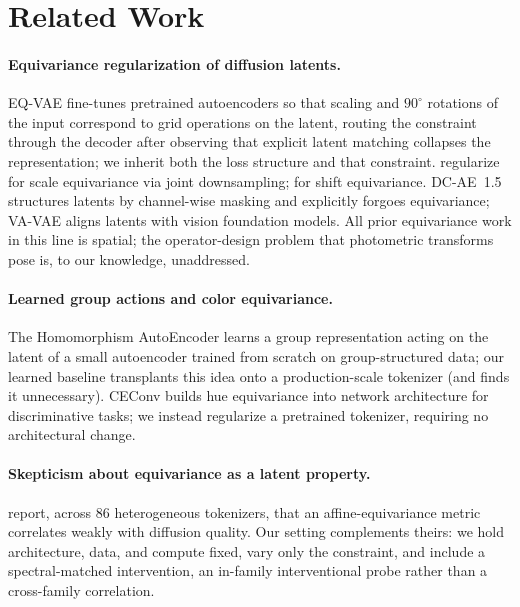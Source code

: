 \documentclass[11pt]{article}
\begin{document}
\section{Related Work}
\label{sec:related}

\paragraph{Equivariance regularization of diffusion latents.}
EQ-VAE \citep{kouzelis2025eqvae} fine-tunes pretrained autoencoders so that
scaling and $90^\circ$ rotations of the input correspond to grid operations on
the latent, routing the constraint through the decoder after observing that
explicit latent matching collapses the representation; we inherit both the
loss structure and that constraint. \citet{skorokhodov2025diffusability}
regularize for scale equivariance via joint downsampling;
\citet{zhou2025afldm} for shift equivariance. DC-AE~1.5
\citep{chen2025dcae15} structures latents by channel-wise masking and
explicitly forgoes equivariance; VA-VAE \citep{yao2025vavae} aligns latents
with vision foundation models. All prior equivariance work in this line is
spatial; the operator-design problem that photometric transforms pose is, to
our knowledge, unaddressed.

\paragraph{Learned group actions and color equivariance.}
The Homomorphism AutoEncoder \citep{keurti2023hae} learns a group
representation acting on the latent of a small autoencoder trained from
scratch on group-structured data; our learned baseline transplants this idea
onto a production-scale tokenizer (and finds it unnecessary). CEConv
\citep{lengyel2023ceconv} builds hue equivariance into network architecture
for discriminative tasks; we instead regularize a pretrained tokenizer,
requiring no architectural change.

\paragraph{Skepticism about equivariance as a latent property.}
\citet{zhong2026rightspace} report, across 86 heterogeneous tokenizers, that
an affine-equivariance metric correlates weakly with diffusion quality. Our
setting complements theirs: we hold architecture, data, and compute fixed,
vary only the constraint, and include a spectral-matched intervention, an
in-family interventional probe rather than a cross-family correlation.
\end{document}

